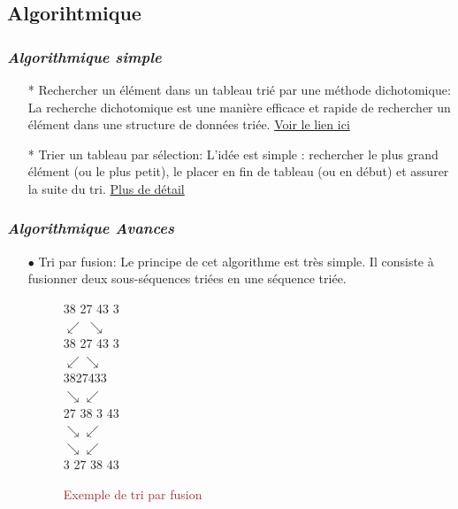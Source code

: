 \documentclass[a4paper, 12pt]{article}
\begin{document}
\subsection{\textbf{Algorihtmique}}
\subsubsection{\textit{Algorithmique simple}}
\begin{itemize}
\item [*]Rechercher un élément dans un tableau trié par une méthode dichotomique:
La recherche dichotomique est une manière efficace et rapide de rechercher un élément dans une structure de données triée. \href{http://openclassrooms.com/courses/recherche-dichotomique}{Voir le lien ici}
\item [*]Trier un tableau par sélection:
	L'idée est simple : rechercher le plus grand élément (ou le plus petit), le placer en fin de tableau (ou en début) et assurer la suite du tri. \href{http://openclassrooms.com/courses/le-tri-par-selection}{Plus de détail}
\end{itemize}

\subsubsection{\textit{Algorithmique Avances}}
    \begin{itemize}
    \item [$\bullet$] Tri par fusion:
    Le principe de cet algorithme est très simple. Il consiste à fusionner deux sous-séquences triées en une séquence triée.\\
     
   \begin{figure}[!h]
  \centering
    \begin{center}
	38		27		43		3\\

$\swarrow$  $\searrow$\\
	38		27	\hspace{1cm}	43		3\\
$\swarrow$\hspace{2cm}$\searrow$\\
38\hspace{0.5cm}27\hspace{2.5cm}43\hspace{0.5cm}3\\
$\searrow$\hspace{2.5cm}$\swarrow$\\
27		38 \hspace{1cm}	3 	43\\
$\searrow$\hspace{1cm}$\swarrow$\\
$\searrow$\hspace{0.1cm}$\swarrow$\\
3	27	38		43\\
	  \end{center}
	  \caption{\textcolor{brown}{Exemple de tri par fusion}}
  \end{figure}
    \end{itemize}
\end{document}
